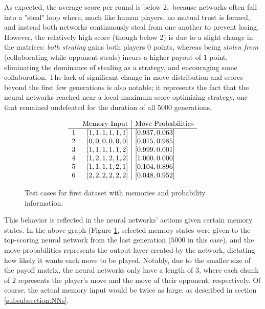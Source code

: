 \documentclass{article}
\begin{document}
As expected, the average score per round is below $2,$ because networks often fall into a "steal" loop where, much like human players, no mutual trust is formed, and instead both networks continuously steal from one another to prevent losing. However, the relatively high score (though below $2$) is due to a slight change in the matrices: \textit{both stealing} gains both players $0$ points, whereas being \textit{stolen from} (collaborating while opponent steals) incurs a higher payout of $1$ point, eliminating the dominance of stealing as a strategy, and encouraging some collaboration. The lack of significant change in move distribution and scores beyond the first few generations is also notable; it represents the fact that the neural networks reached near a local maximum score-optimizing strategy, one that remained undefeated for the duration of all $5000$ generations.

\begin{figure}[h]
	\[\begin{array}{l r|l}
		&\text{Memory Input} & \text{Move Probabilities} \\
		\hline
		1&{[1, 1, 1, 1, 1, 1]} & {[0.937, 0.063]} \\
		2&{[0, 0, 0, 0, 0, 0]} & {[0.015, 0.985]} \\
		3&{[1, 1, 1, 1, 1, 2]} & {[0.999, 0.001]} \\
		4&{[1, 2, 1, 2, 1, 2]} & {[1.000, 0.000]} \\
		5&{[1, 1, 1, 1, 2, 1]} & {[0.104, 0.896]} \\
		6&{[2, 2, 2, 2, 2, 2]} & {[0.048, 0.952]} \\
	\end{array}\]
  \caption{Test cases for first dataset with memories and probability information.}
  \label{fig:1607068848885-cases}
\end{figure}

This behavior is reflected in the neural networks' actions given certain memory states. In the above graph (Figure \ref{fig:1607068848885-cases}, selected memory states were given to the top-scoring neural network from the last generation ($5000$ in this case), and the move probabilities represents the output layer created by the network, dictating how  likely it wants each move to be played. Notably, due to the smaller size of the payoff matrix, the neural networks only have a length of $3$, where each chunk of $2$ represents the player's move and the move of their opponent, respectively. Of course, the actual memory input would be twice as large, as described in section \ref{subsubsection:NNs}.
\end{document}
